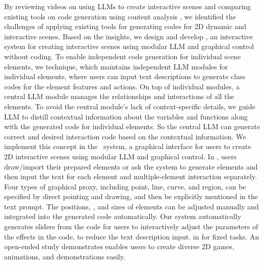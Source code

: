 By reviewing videos on using LLMs to create interactive scenes and comparing existing tools on code generation using content analysis \cite{harwood2003overview}, we identified the challenges of applying existing tools for generating codes for 2D dynamic and interactive scenes. Based on the insights, we design and develop \sysName, an interactive system for creating interactive scenes using modular LLM and graphical control without coding. To enable independent code generation for individual {scene} elements, %
we 
{technique}, which {maintains} %
independent LLM modules for {individual elements}, %
where users can input text descriptions to generate class codes for the element features and actions. On top of individual modules, a central LLM module manages the relationships and interactions of all the elements. 
To avoid {the central module's lack of} context-specific details, we guide LLM to {distill}
contextual information about the variables and functions along with the generated code for individual elements. So the central LLM can generate correct and desired interaction code based on the contextual information. We implement this concept in the \sysName~system, a graphical interface for users {to create} %
2D interactive scenes using modular LLM and graphical control. In \sysName, users draw/import their prepared elements or ask the system to generate elements and then input the text for each element and multiple-element interaction separately. Four types of graphical proxy, including point, line, curve, and region, can be specified by direct pointing and drawing, and then %
be explicitly mentioned in the text prompt. The positions, ,
and sizes of elements can be adjusted manually and %
integrated {into} the generated code {automatically}. Our system automatically generates sliders from the code for users {to interactively adjust the} %
parameters of the effects in the code, {to reduce the text description input}.  %
in 
for fixed tasks{. An open-ended study demonstrates \sysName} {enables users to} %
create diverse 2D games, animations, and demonstrations easily.

